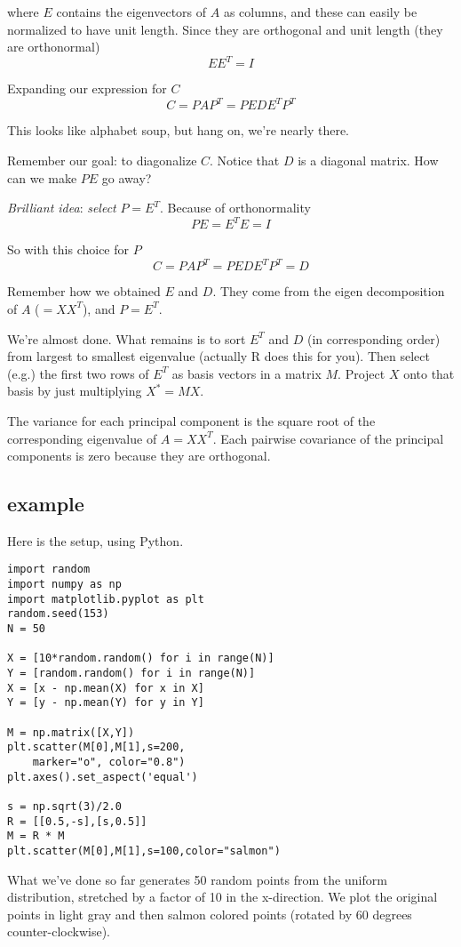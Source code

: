 \documentclass[11pt, oneside]{article}
\begin{document}
where $E$ contains the eigenvectors of $A$ as columns, and these can easily be normalized to have unit length.  Since they are orthogonal and unit length (they are orthonormal)
\[ E E^T = I \]

Expanding our expression for $C$
\[ C = P A P^T = P E D E^T P^T \]

This looks like alphabet soup, but hang on, we're nearly there.  

Remember our goal:  to diagonalize $C$.  Notice that $D$ is a diagonal matrix.  How can we make $PE$ go away?

\emph{Brilliant idea}:  \emph{select} $P = E^T$.  Because of orthonormality
\[ PE = E^T E = I \]

So with this choice for $P$
\[ C = P A P^T = P E D E^T P^T = D \]

Remember how we obtained $E$ and $D$.  They come from the eigen decomposition of $A$ ($ = X X^T$), and $P = E^T$.

We're almost done.  What remains is to sort $E^T$ and $D$ (in corresponding order) from largest to smallest eigenvalue (actually R does this for you).  Then select (e.g.) the first two rows of $E^T$ as basis vectors in a matrix $M$.  Project $X$ onto that basis by just multiplying $X^* = M X$.

The variance for each principal component is the square root of the corresponding eigenvalue of $A = X X^T$.  Each pairwise covariance of the principal components is zero because they are orthogonal.

\subsection*{example}

Here is the setup, using Python.  

\begin{verbatim}
import random
import numpy as np
import matplotlib.pyplot as plt
random.seed(153)
N = 50

X = [10*random.random() for i in range(N)]
Y = [random.random() for i in range(N)]
X = [x - np.mean(X) for x in X]
Y = [y - np.mean(Y) for y in Y]

M = np.matrix([X,Y])
plt.scatter(M[0],M[1],s=200,
    marker="o", color="0.8")
plt.axes().set_aspect('equal')

s = np.sqrt(3)/2.0
R = [[0.5,-s],[s,0.5]]
M = R * M
plt.scatter(M[0],M[1],s=100,color="salmon")
\end{verbatim}

What we've done so far generates 50 random points from the uniform distribution, stretched by a factor of 10 in the x-direction.  We plot the original points in light gray and then salmon colored points (rotated by 60 degrees counter-clockwise).  
\end{document}
